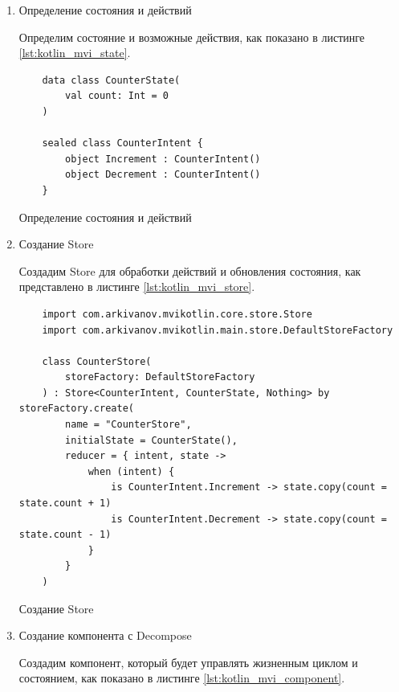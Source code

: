 \documentclass[14pt, russian]{scrartcl}
\begin{document}
\begin{enumerate}
    \item Определение состояния и действий

    Определим состояние и возможные действия, как показано в листинге \ref{lst:kotlin_mvi_state}.

    \begin{listing}[H]
    \begin{verbatim}
    data class CounterState(
        val count: Int = 0
    )

    sealed class CounterIntent {
        object Increment : CounterIntent()
        object Decrement : CounterIntent()
    }
    \end{verbatim}
    \caption{Определение состояния и действий}
    \label{lst:kotlin_mvi_state}
    \end{listing}

    \item Создание Store

    Создадим Store для обработки действий и обновления состояния, как представлено в листинге \ref{lst:kotlin_mvi_store}.

    \begin{listing}[H]
    \begin{verbatim}
    import com.arkivanov.mvikotlin.core.store.Store
    import com.arkivanov.mvikotlin.main.store.DefaultStoreFactory

    class CounterStore(
        storeFactory: DefaultStoreFactory
    ) : Store<CounterIntent, CounterState, Nothing> by storeFactory.create(
        name = "CounterStore",
        initialState = CounterState(),
        reducer = { intent, state ->
            when (intent) {
                is CounterIntent.Increment -> state.copy(count = state.count + 1)
                is CounterIntent.Decrement -> state.copy(count = state.count - 1)
            }
        }
    )
    \end{verbatim}
    \caption{Создание Store}
    \label{lst:kotlin_mvi_store}
    \end{listing}

    \item Создание компонента с Decompose

    Создадим компонент, который будет управлять жизненным циклом и состоянием, как показано в листинге \ref{lst:kotlin_mvi_component}.


\end{enumerate}
\end{document}
